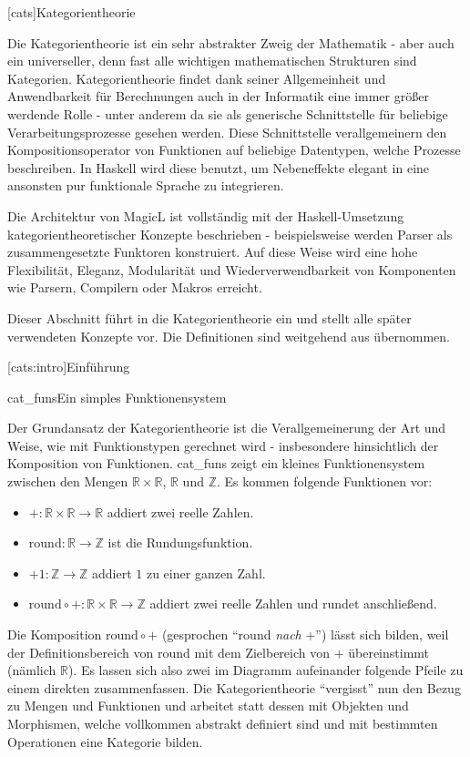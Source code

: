\documentclass[11pt, a4paper, bibgerm]{scrbook}
\newcommand\lchapter{}
\newcommand\lsection{}
\newcommand\abb{}
\newcommand\fig{}
\newcommand\ato{\rightarrow} %
\begin{document}
\lchapter[cats]{Kategorientheorie}

Die Kategorientheorie ist ein sehr abstrakter Zweig der Mathematik -
aber auch ein universeller, denn fast alle wichtigen mathematischen
Strukturen sind Kategorien. Kategorientheorie findet dank seiner
Allgemeinheit und Anwendbarkeit für Berechnungen auch in der Informatik
eine immer größer werdende Rolle - unter anderem da sie als generische
Schnittstelle für beliebige Verarbeitungsprozesse gesehen werden. Diese
Schnittstelle verallgemeinern den Kompositionsoperator von Funktionen
auf beliebige Datentypen, welche Prozesse beschreiben. In Haskell wird
diese benutzt, um Nebeneffekte elegant in eine ansonsten pur funktionale
Sprache zu integrieren.

Die Architektur von MagicL ist vollständig mit der Haskell-Umsetzung
kategorientheoretischer Konzepte beschrieben - beispielsweise werden
Parser als zusammengesetzte Funktoren konstruiert. Auf diese Weise wird
eine hohe Flexibilität, Eleganz, Modularität und Wiederverwendbarkeit
von Komponenten wie Parsern, Compilern oder Makros erreicht.

Dieser Abschnitt führt in die Kategorientheorie ein und
stellt alle später verwendeten Konzepte vor. Die Definitionen sind
weitgehend aus \cite{Grundlagen} übernommen.

\lsection[cats:intro]{Einführung}

\fig{cat_funs}{Ein simples Funktionensystem}

Der Grundansatz der Kategorientheorie ist die Verallgemeinerung der
Art und Weise, wie mit Funktionstypen gerechnet wird - insbesondere
hinsichtlich der Komposition von Funktionen. \abb{cat_funs} zeigt ein
kleines Funktionensystem zwischen den Mengen $\mathbb{R} \times
\mathbb{R}$, $\mathbb{R}$ und $\mathbb{Z}$. Es kommen folgende
Funktionen vor:
\begin{itemize}
\item $+ : \mathbb{R} \times \mathbb{R} \ato \mathbb{R}$ addiert zwei
  reelle Zahlen.
\item $\mathrm{round} : \mathbb{R} \ato \mathbb{Z}$ ist die
  Rundungsfunktion.
\item $+1 : \mathbb{Z} \ato \mathbb{Z}$ addiert $1$ zu einer ganzen Zahl.
\item $\mathrm{round} \circ + : \mathbb{R} \times \mathbb{R} \ato \mathbb{Z}$
  addiert zwei reelle Zahlen und rundet anschließend.
\end{itemize}

Die Komposition $\mathrm{round} \circ +$ (gesprochen "`round \textit{nach}
+"') lässt sich bilden, weil der Definitionsbereich von $\mathrm{round}$
mit dem Zielbereich von $+$ übereinstimmt (nämlich $\mathbb{R}$). Es
lassen sich also zwei im Diagramm aufeinander folgende Pfeile zu einem
direkten zusammenfassen. Die Kategorientheorie "`vergisst"' nun den
Bezug zu Mengen und Funktionen und arbeitet statt dessen mit Objekten
und Morphismen, welche vollkommen abstrakt definiert sind und mit
bestimmten Operationen eine Kategorie bilden.
\end{document}
